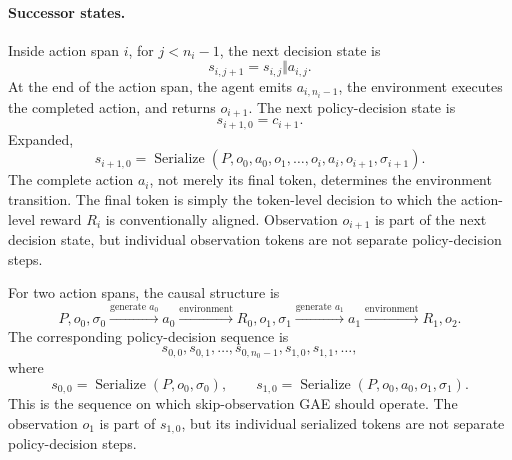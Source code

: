 \paragraph{Successor states.}
Inside action span $i$, for $j<n_i-1$, the next decision state is
\[
    s_{i,j+1}=s_{i,j}\Vert a_{i,j}.
\]
At the end of the action span, the agent emits $a_{i,n_i-1}$, the environment executes the completed action, and returns $o_{i+1}$. The next policy-decision state is
\[
    s_{i+1,0}=c_{i+1}.
\]
Expanded,
\[
    s_{i+1,0}
    =
    \operatorname{Serialize}(P,o_0,a_0,o_1,\ldots,o_i,a_i,o_{i+1},\sigma_{i+1}).
\]
The complete action $a_i$, not merely its final token, determines the environment transition. The final token is simply the token-level decision to which the action-level reward $R_i$ is conventionally aligned. Observation $o_{i+1}$ is part of the next decision state, but individual observation tokens are not separate policy-decision steps.

For two action spans, the causal structure is
\[
    P,o_0,\sigma_0
    \xrightarrow{\text{generate }a_0}
    a_0
    \xrightarrow{\text{environment}}
    R_0,o_1,\sigma_1
    \xrightarrow{\text{generate }a_1}
    a_1
    \xrightarrow{\text{environment}}
    R_1,o_2.
\]
The corresponding policy-decision sequence is
\[
    s_{0,0},s_{0,1},\ldots,s_{0,n_0-1},s_{1,0},s_{1,1},\ldots,
\]
where
\[
    s_{0,0}=\operatorname{Serialize}(P,o_0,\sigma_0),
    \qquad
    s_{1,0}=\operatorname{Serialize}(P,o_0,a_0,o_1,\sigma_1).
\]
This is the sequence on which skip-observation GAE should operate. The observation $o_1$ is part of $s_{1,0}$, but its individual serialized tokens are not separate policy-decision steps.

